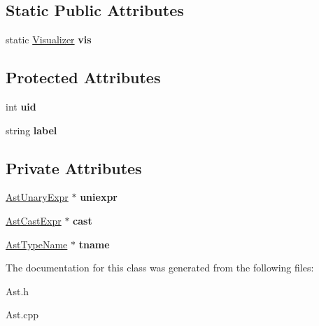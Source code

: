 \subsection*{Static Public Attributes}
\begin{DoxyCompactItemize}
\item 
\hypertarget{classAST_aca9e6637209b31e03a09c0d42f29bdfa}{static \hyperlink{classVisualizer}{Visualizer} {\bfseries vis}}\label{classAST_aca9e6637209b31e03a09c0d42f29bdfa}

\end{DoxyCompactItemize}
\subsection*{Protected Attributes}
\begin{DoxyCompactItemize}
\item 
\hypertarget{classAST_a847b778f1c3dd5a19de32de432ee6e15}{int {\bfseries uid}}\label{classAST_a847b778f1c3dd5a19de32de432ee6e15}

\item 
\hypertarget{classAST_ab2e239ccc0688d2341724432ff5a1a31}{string {\bfseries label}}\label{classAST_ab2e239ccc0688d2341724432ff5a1a31}

\end{DoxyCompactItemize}
\subsection*{Private Attributes}
\begin{DoxyCompactItemize}
\item 
\hypertarget{classAstCastExpr_a86329e922d77a0677b3e469f912016e1}{\hyperlink{classAstUnaryExpr}{Ast\-Unary\-Expr} $\ast$ {\bfseries uniexpr}}\label{classAstCastExpr_a86329e922d77a0677b3e469f912016e1}

\item 
\hypertarget{classAstCastExpr_a07a9c98c771df7af879ecca441ec6242}{\hyperlink{classAstCastExpr}{Ast\-Cast\-Expr} $\ast$ {\bfseries cast}}\label{classAstCastExpr_a07a9c98c771df7af879ecca441ec6242}

\item 
\hypertarget{classAstCastExpr_a5f9e893772885a67da56ecf4e01c8e5c}{\hyperlink{classAstTypeName}{Ast\-Type\-Name} $\ast$ {\bfseries tname}}\label{classAstCastExpr_a5f9e893772885a67da56ecf4e01c8e5c}

\end{DoxyCompactItemize}


The documentation for this class was generated from the following files\-:\begin{DoxyCompactItemize}
\item 
Ast.\-h\item 
Ast.\-cpp\end{DoxyCompactItemize}
